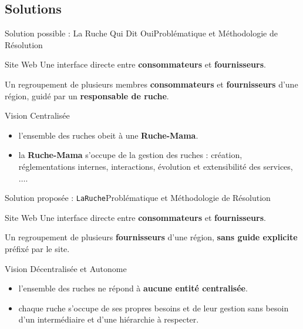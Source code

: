 \documentclass[usenames,dvipsnames]{beamer}
\begin{document}
\subsection{Solutions}
\begin{frame}{Solution possible : La Ruche Qui Dit Oui}{Problématique et Méthodologie de Résolution}
\begin{block}{Site Web}
Une interface directe entre \textbf{consommateurs} et \textbf{fournisseurs}.
\end{block}

\begin{definition}[Ruche]
Un regroupement de plusieurs membres \textbf{consommateurs} et \textbf{fournisseurs} d'une région, guidé par un \textbf{responsable de ruche}.
\end{definition}

\begin{block}{Vision Centralisée}
\begin{itemize}
  \item l'ensemble des ruches obeit à une \textbf{Ruche-Mama}.
  \item la \textbf{Ruche-Mama} s'occupe de la gestion des ruches : création, réglementations internes, interactions, évolution et extensibilité des services, $\dots$.
\end{itemize}
\end{block}
\end{frame}

\begin{frame}{Solution proposée : \texttt{LaRuche}}{Problématique et Méthodologie de Résolution}
\begin{block}{Site Web}
Une interface directe entre \textbf{consommateurs} et \textbf{fournisseurs}.
\end{block}

\begin{definition}[Ruche]
Un regroupement de plusieurs \textbf{fournisseurs} d'une région, \textbf{sans guide explicite} préfixé par le site.
\end{definition}

\begin{block}{Vision Décentralisée et Autonome}
\begin{itemize}
  \item l'ensemble des ruches ne répond à \textbf{aucune entité centralisée}.
  \item chaque ruche s'occupe de ses propres besoins et de leur gestion sans besoin d'un intermédiaire et d'une hiérarchie à respecter.
\end{itemize}
\end{block}
\end{frame}
\end{document}
